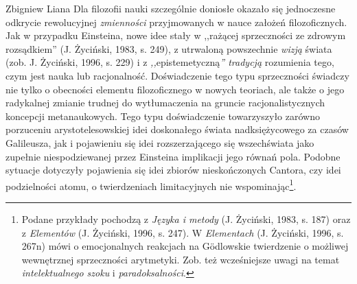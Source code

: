 \begin{artplenv}{Zbigniew Liana}
Dla filozofii nauki szczególnie doniosłe okazało się jednoczesne odkrycie rewolucyjnej \textit{zmienności} przyjmowanych w
nauce założeń filozoficznych. Jak w przypadku Einsteina, nowe idee stały w ,,rażącej sprzeczności ze zdrowym rozsądkiem''
\label{ref:RND5BoFYxeq4l}(J. Życiński, 1983, s. 249), z utrwaloną powszechnie \textit{wizją} świata
\label{ref:RND3mHQnO08gW}(zob. J. Życiński, 1996, s. 229) i z \textit{,,}epistemetyczną\textit{'' tradycją} rozumienia tego,
czym jest nauka lub racjonalność.  Doświadczenie tego typu sprzeczności świadczy nie tylko o obecności elementu
filozoficznego w nowych teoriach, ale także o jego radykalnej zmianie trudnej do wytłumaczenia na gruncie
racjonalistycznych koncepcji metanaukowych. Tego typu doświadczenie towarzyszyło zarówno porzuceniu arystotelesowskiej
idei doskonałego świata nadksiężycowego za czasów Galileusza, jak i pojawieniu się idei rozszerzającego się
wszechświata jako zupełnie niespodziewanej przez Einsteina implikacji jego równań pola. Podobne sytuacje dotyczyły
pojawienia się idei zbiorów nieskończonych Cantora, czy idei podzielności atomu, o twierdzeniach limitacyjnych nie
wspominając\footnote{Podane przykłady pochodzą z \textit{Języka i metody} \label{ref:RNDrtmG57I1dG}(J. Życiński, 1983, s.
	187) oraz z \textit{Elementów} \label{ref:RNDorQuglTydR}(J. Życiński, 1996, s. 247). W \textit{Elementach}
	\label{ref:RNDYo0f9hcHkW}(J. Życiński, 1996, s. 267n) mówi o emocjonalnych reakcjach na Gödlowskie twierdzenie o
	możliwej wewnętrznej sprzeczności arytmetyki. Zob. też wcześniejsze uwagi na temat \textit{intelektualnego szoku} i
	\textit{paradoksalności}. }.


\end{artplenv}
